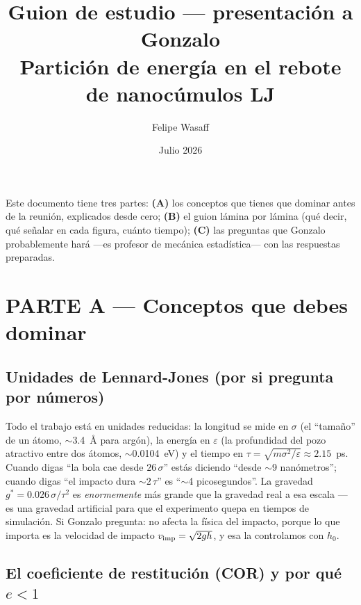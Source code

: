 \documentclass[11pt,a4paper]{article}
\title{\textbf{Guion de estudio --- presentación a Gonzalo}\\
\large Partición de energía en el rebote de nanocúmulos LJ}
\author{Felipe Wasaff}
\date{Julio 2026}
\newcommand{\eps}{\varepsilon}
\newcommand{\gstar}{g^*}
\begin{document}
\maketitle

\noindent Este documento tiene tres partes: \textbf{(A)} los conceptos que
tienes que dominar antes de la reunión, explicados desde cero;
\textbf{(B)} el guion lámina por lámina (qué decir, qué señalar en cada
figura, cuánto tiempo); \textbf{(C)} las preguntas que Gonzalo
probablemente hará ---es profesor de mecánica estadística--- con las
respuestas preparadas.

\tableofcontents

\section{PARTE A --- Conceptos que debes dominar}

\subsection{Unidades de Lennard-Jones (por si pregunta por números)}

Todo el trabajo está en unidades reducidas: la longitud se mide en
$\sigma$ (el ``tamaño'' de un átomo, $\sim$3.4~\AA{} para argón), la
energía en $\eps$ (la profundidad del pozo atractivo entre dos átomos,
$\sim$0.0104~eV) y el tiempo en $\tau=\sqrt{m\sigma^2/\eps}\approx2.15$~ps.
Cuando digas ``la bola cae desde $26\,\sigma$'' estás diciendo ``desde
$\sim$9 nanómetros''; cuando digas ``el impacto dura $\sim2\,\tau$'' es
``$\sim$4 picosegundos''. La gravedad $\gstar=0.026\,\sigma/\tau^2$ es
\emph{enormemente} más grande que la gravedad real a esa escala --- es una
gravedad artificial para que el experimento quepa en tiempos de
simulación. Si Gonzalo pregunta: no afecta la física del impacto, porque
lo que importa es la velocidad de impacto $v_{\rm imp}=\sqrt{2gh}$, y esa
la controlamos con $h_0$.

\subsection{El coeficiente de restitución (COR) y por qué \texorpdfstring{$e<1$}{e<1}}
\end{document}
